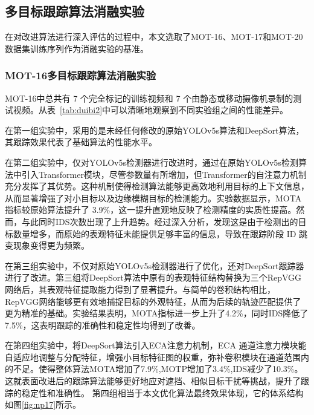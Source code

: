 \subsection{多目标跟踪算法消融实验}

在对改进算法进行深入评估的过程中，本文选取了MOT-16、MOT-17和MOT-20数据集训练序列作为消融实验的基准。


\subsubsection{MOT-16多目标跟踪算法消融实验}

MOT-16中总共有 7 个完全标记的训练视频和 7 个由静态或移动摄像机录制的测试视频。从表~\ref{tab:duibi2}中可以清晰地观察到不同实验组之间的性能差异。

在第一组实验中，采用的是未经任何修改的原始YOLOv5s算法和DeepSort算法，其跟踪效果代表了基础算法的性能水平。

在第二组实验中，仅对YOLOv5s检测器进行改进时，通过在原始YOLOv5s检测算法中引入Transformer模块，尽管参数量有所增加，但Transformer的自注意力机制充分发挥了其优势。这种机制使得检测算法能够更高效地利用目标的上下文信息，从而显著增强了对小目标以及边缘模糊目标的检测能力。实验数据显示，MOTA指标较原始算法提升了 3.9\%，这一提升直观地反映了检测精度的实质性提高。然而，与此同时IDS次数出现了上升趋势。经过深入分析，发现这是由于检测出的目标数量增多，而原始的表观特征未能提供足够丰富的信息，导致在跟踪阶段 ID 跳变现象变得更为频繁。

在第三组实验中，不仅对原始YOLOv5s检测器进行了优化，还对DeepSort跟踪器进行了改进。第三组将DeepSort算法中原有的表观特征结构替换为三个RepVGG网络后，其表观特征提取能力得到了显著提升。与简单的卷积结构相比，RepVGG网络能够更有效地捕捉目标的外观特征，从而为后续的轨迹匹配提供了更为精准的基础。实验结果表明，MOTA指标进一步上升了4.2\%，同时IDS降低了7.5\%，这表明跟踪的准确性和稳定性均得到了改善。

在第四组实验中，将DeepSort算法引入ECA注意力机制，ECA 通道注意力模块能自适应地调整与分配特征，增强小目标特征图的权重，弥补卷积模块在通道范围内的不足。使得整体算法MOTA增加了7.9\%,MOTP增加了3.4\%,IDS减少了10.3\%。这就表面改进后的跟踪算法能够更好地应对遮挡、相似目标干扰等挑战，提升了跟踪的稳定性和准确性。
第四组相当于本文优化算法最终效果体现，它的体系结构如图\ref{fig:np17}所示。




